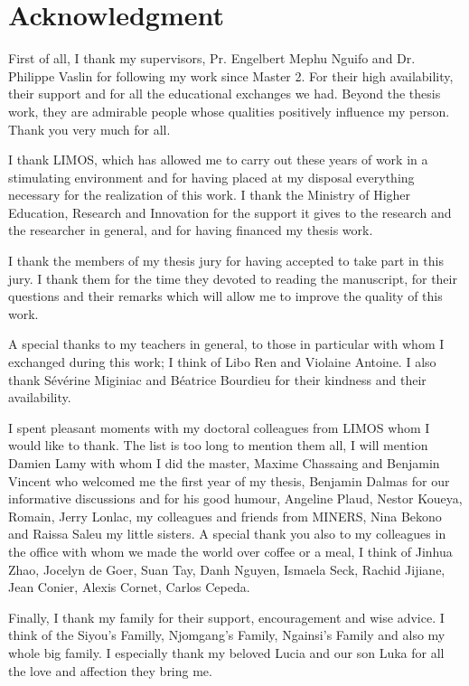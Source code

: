 \chapter*{Acknowledgment}
First of all, I thank my supervisors, Pr. Engelbert Mephu Nguifo and Dr.  Philippe Vaslin for following my work since Master 2. For their high availability, their support and for all the educational exchanges we had. Beyond the thesis work, they are admirable people whose qualities positively influence my person. Thank you very much for all.

I thank LIMOS, which has allowed me to carry out these years of work in a stimulating environment and for having placed at my disposal everything necessary for the realization of this work. I thank  the Ministry of Higher Education, Research and Innovation  for the support it gives to the research and the researcher in general, and for having financed my thesis work. 

I thank the members of my thesis jury for having accepted to take part in this jury. I thank them for the time they devoted to reading the manuscript, for their questions and their remarks which will allow me to improve the quality of this work.

A special thanks to my teachers in general, to those in particular with whom I exchanged during this work; I think of Libo Ren and Violaine Antoine. I also thank Sévérine Miginiac and Béatrice Bourdieu for their kindness and their availability.

I spent pleasant moments with my doctoral colleagues from LIMOS whom I would like to thank. The list is too long to mention them all, I will mention Damien Lamy with whom I did the master, Maxime Chassaing and Benjamin Vincent who welcomed me the first year of my thesis, Benjamin Dalmas for our informative discussions and for his good humour, Angeline Plaud, Nestor Koueya, Romain, Jerry Lonlac, my colleagues and friends from MINERS, Nina Bekono and Raissa Saleu my little sisters. 
A special thank you also to my colleagues in the office with whom we made the world over coffee or a meal, I think of Jinhua Zhao, Jocelyn de Goer, Suan Tay, Danh Nguyen, Ismaela Seck, Rachid Jijiane, Jean Conier, Alexis Cornet, Carlos Cepeda.

Finally, I thank my family for their support, encouragement and wise advice. I think of the Siyou’s Familly, Njomgang’s Family, Ngainsi’s Family  and also my whole big family. I especially thank my beloved Lucia and our son Luka for all the love and affection they bring me. 
